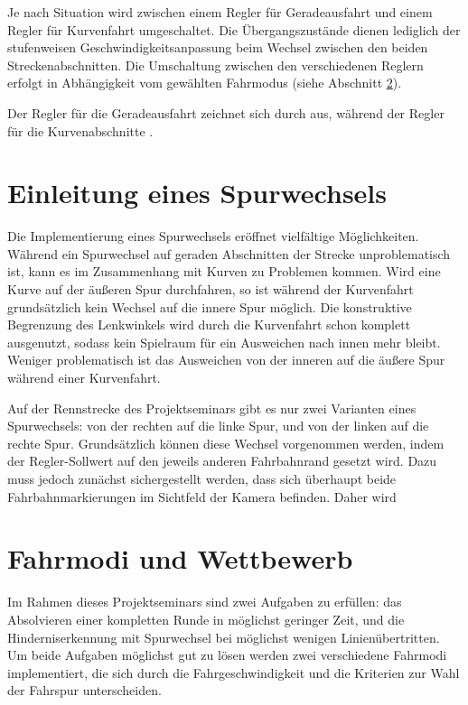 
Je nach Situation wird zwischen einem Regler für Geradeausfahrt und einem Regler für Kurvenfahrt umgeschaltet. Die Übergangszustände dienen lediglich der stufenweisen Geschwindigkeitsanpassung beim Wechsel zwischen den beiden Streckenabschnitten. Die Umschaltung zwischen den verschiedenen Reglern erfolgt in Abhängigkeit vom gewählten Fahrmodus (siehe Abschnitt \ref{sec:fahrmodi}).

Der Regler für die Geradeausfahrt zeichnet sich durch  aus, während der Regler für die Kurvenabschnitte .


\section{Einleitung eines Spurwechsels}
\label{sec:spurwechsel}

Die Implementierung eines Spurwechsels eröffnet vielfältige Möglichkeiten. Während ein Spurwechsel auf geraden Abschnitten der Strecke unproblematisch ist, kann es im Zusammenhang mit Kurven zu Problemen kommen. Wird eine Kurve auf der äußeren Spur durchfahren, so ist während der Kurvenfahrt grundsätzlich kein Wechsel auf die innere Spur möglich. Die konstruktive Begrenzung des Lenkwinkels wird durch die Kurvenfahrt schon komplett ausgenutzt, sodass kein Spielraum für ein Ausweichen nach innen mehr bleibt. Weniger problematisch ist das Ausweichen von der inneren auf die äußere Spur während einer Kurvenfahrt.

Auf der Rennstrecke des Projektseminars gibt es nur zwei Varianten eines Spurwechsels: von der rechten auf die linke Spur, und von der linken auf die rechte Spur. Grundsätzlich können diese Wechsel vorgenommen werden, indem der Regler-Sollwert auf den jeweils anderen Fahrbahnrand gesetzt wird. Dazu muss jedoch zunächst sichergestellt werden, dass sich überhaupt beide Fahrbahnmarkierungen im Sichtfeld der Kamera befinden. Daher wird 


\section{Fahrmodi und Wettbewerb}
\label{sec:fahrmodi}

Im Rahmen dieses Projektseminars sind zwei Aufgaben zu erfüllen: das Absolvieren einer kompletten Runde in möglichst geringer Zeit, und die Hinderniserkennung mit Spurwechsel bei möglichst wenigen Linienübertritten. Um beide Aufgaben möglichst gut zu lösen werden zwei verschiedene Fahrmodi implementiert, die sich durch die Fahrgeschwindigkeit und die Kriterien zur Wahl der Fahrspur unterscheiden.

